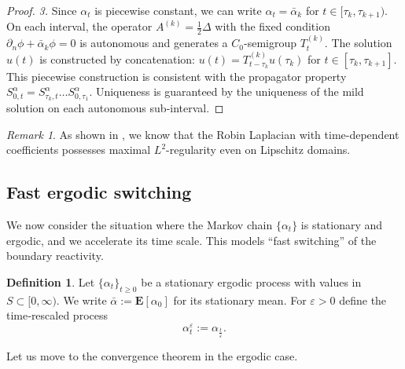 \documentclass[11pt]{amsart}
\theoremstyle{plain}
\theoremstyle{definition}
\newtheorem{definition}[theorem]{Definition}
\theoremstyle{remark}
\newtheorem{remark}[theorem]{Remark}
\begin{document}
\begin{proof}
	\emph{3.} Since $\alpha_t$ is piecewise constant, we can write $\alpha_t = \bar{\alpha}_k$ for $t \in [\tau_k, \tau_{k+1})$. On each interval, the operator $A^{(k)} = \frac{1}{2}\Delta$ with the fixed condition $\partial_n \phi + \bar{\alpha}_k \phi = 0$ is autonomous and generates a $C_0$-semigroup $T_t^{(k)}$. The solution $u(t)$ is constructed by concatenation: $u(t) = T_{t-\tau_k}^{(k)} u(\tau_k)$ for $t \in [\tau_k, \tau_{k+1}]$. This piecewise construction is consistent with the propagator property $S_{0,t}^\alpha = S_{\tau_k,t}^\alpha \dots S_{0,\tau_1}^\alpha$. Uniqueness is guaranteed by the uniqueness of the mild solution on each autonomous sub-interval.
	\end{proof}
	\begin{remark}
	As shown in \cite[Section 5]{ArendtMonniaux2016}, we know that the Robin Laplacian with time-dependent coefficients possesses maximal $L^2$-regularity even on Lipschitz domains.
	\end{remark}
	
	
	\subsection{Fast ergodic switching}
We now consider the situation where the Markov chain $\{\alpha_t\}$ is stationary and ergodic, and we accelerate its time scale. This models ``fast switching'' of the boundary reactivity.

\begin{definition}
	Let $\{\alpha_t\}_{t\ge0}$ be a stationary ergodic process with values in $S\subset[0,\infty)$. We write $\bar\alpha:=\mathbf E[\alpha_0]$ for its stationary mean. For $\varepsilon>0$ define the time‑rescaled process
	\[ \alpha^\varepsilon_t := \alpha_\frac{t}{\varepsilon}. \]
\end{definition}

Let us move to the convergence theorem in the ergodic case.
\end{document}
